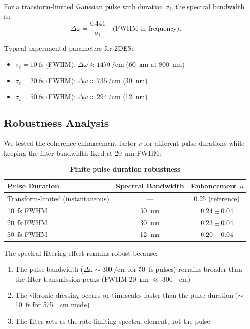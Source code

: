 \documentclass[11pt,a4paper]{article}
\begin{document}
For a transform-limited Gaussian pulse with duration $\sigma_t$, the spectral bandwidth is:
\begin{equation}
\Delta\omega = \frac{0.441}{\sigma_t} \quad \text{(FWHM in frequency)}.
\label{eq:transform_limit}
\end{equation}

Typical experimental parameters for 2DES:
\begin{itemize}
    \item $\sigma_t = \SI{10}{\femto\second}$ (FWHM): $\Delta\omega \approx \SI{1470}{\per\centi\meter}$ (\SI{60}{\nano\meter} at \SI{800}{\nano\meter})
    \item $\sigma_t = \SI{20}{\femto\second}$ (FWHM): $\Delta\omega \approx \SI{735}{\per\centi\meter}$ (\SI{30}{\nano\meter})
    \item $\sigma_t = \SI{50}{\femto\second}$ (FWHM): $\Delta\omega \approx \SI{294}{\per\centi\meter}$ (\SI{12}{\nano\meter})
\end{itemize}

\subsection{Robustness Analysis}

We tested the coherence enhancement factor $\eta$ for different pulse durations while keeping the filter bandwidth fixed at \SI{20}{\nano\meter} FWHM:

\begin{table}[h]
\centering
\caption{\textbf{Finite pulse duration robustness}}
\label{tab:SI_pulse_duration}
\begin{tabular}{lcc}
\toprule
\textbf{Pulse Duration} & \textbf{Spectral Bandwidth} & \textbf{Enhancement $\eta$} \\
\midrule
Transform-limited (instantaneous) & --- & 0.25 (reference) \\
\SI{10}{\femto\second} FWHM & \SI{60}{\nano\meter} & $0.24 \pm 0.04$ \\
\SI{20}{\femto\second} FWHM & \SI{30}{\nano\meter} & $0.23 \pm 0.04$ \\
\SI{50}{\femto\second} FWHM & \SI{12}{\nano\meter} & $0.20 \pm 0.04$ \\
\bottomrule
\end{tabular}
\end{table}

The spectral filtering effect remains robust because:
\begin{enumerate}
    \item The pulse bandwidth ($\Delta\omega \sim \SI{300}{\per\centi\meter}$ for \SI{50}{\femto\second} pulses) remains broader than the filter transmission peaks (FWHM \SI{20}{\nano\meter} $\approx$ \SI{300}{\per\centi\meter})
    \item The vibronic dressing occurs on timescales faster than the pulse duration ($\sim$\SI{10}{\femto\second} for \SI{575}{\per\centi\meter} mode)
    \item The filter acts as the rate-limiting spectral element, not the pulse
\end{enumerate}
\end{document}
